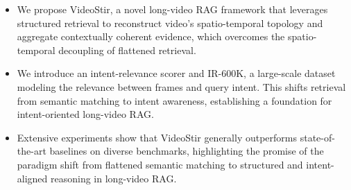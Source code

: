 \begin{itemize}
\setlength{\itemsep}{2pt}
\setlength{\parsep}{2pt}
\setlength{\parskip}{2pt}
    \item We propose VideoStir, a novel long-video RAG framework that leverages structured retrieval to reconstruct video's spatio-temporal topology and aggregate contextually coherent evidence, which overcomes the spatio-temporal decoupling of flattened retrieval.
    \item We introduce an intent-relevance scorer and IR-600K, a large-scale dataset modeling the relevance between frames and query intent. This shifts retrieval from semantic matching to intent awareness, establishing a foundation for intent-oriented long-video RAG.
    \item Extensive experiments show that VideoStir generally outperforms state-of-the-art baselines on diverse benchmarks, highlighting the promise of the paradigm shift from flattened semantic matching to structured and intent-aligned reasoning in long-video RAG.

\end{itemize}

    

    

